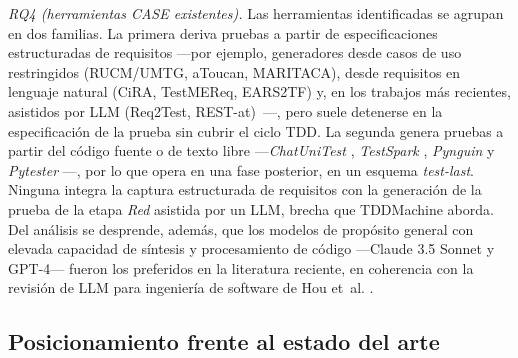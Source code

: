 \documentclass[10pt,journal,twoside,letterpaper]{IEEEtran}
\begin{document}
	\textit{RQ4 (herramientas CASE existentes).} Las herramientas identificadas se agrupan en dos familias. La primera deriva pruebas a partir de especificaciones estructuradas de requisitos ---por ejemplo, generadores desde casos de uso restringidos (RUCM/UMTG, aToucan, MARITACA), desde requisitos en lenguaje natural (CiRA, TestMEReq, EARS2TF) y, en los trabajos más recientes, asistidos por LLM (Req2Test, REST-at)~\cite{Morales2024Dsl,Khaldi2026Agentic,Orekhov2026Example,Fathima2026Automated,Bhatia2025Automated,Jang2025Automatic,Shimizu2025Automatic,Ishinari2026Data,Arruda2026Deriving,Trinh2026Fstg,Ishinari2025Improving,Louzaoui2016Invalid,Borg2022Quality,LeonQuinstedt2026Rest,Franca2026Req2test,Sinha2015Requirements,Wei2024Requirements,Wen2026Research,Salari2026Test,Varpe2025User,Li2026Test,Trinh2026Tcg,Wu2022Node,Herwanto2025Enhancing,Baker2026Industrial,Dilorenzo2026Recommending}---, pero suele detenerse en la especificación de la prueba sin cubrir el ciclo TDD. La segunda genera pruebas a partir del código fuente o de texto libre ---\emph{ChatUniTest} \cite{chen2024chatunitest}, \emph{TestSpark} \cite{sapozhnikov2024testspark}, \emph{Pynguin} \cite{lukasczyk2022pynguin} y \emph{Pytester} \cite{takerngsaksiri2025pytester}---, por lo que opera en una fase posterior, en un esquema \emph{test-last}. Ninguna integra la captura estructurada de requisitos con la generación de la prueba de la etapa \emph{Red} asistida por un LLM, brecha que TDDMachine aborda. Del análisis se desprende, además, que los modelos de propósito general con elevada capacidad de síntesis y procesamiento de código ---Claude 3.5 Sonnet y GPT-4--- fueron los preferidos en la literatura reciente, en coherencia con la revisión de LLM para ingeniería de software de Hou et~al. \cite{hou2024llm4se}.

	\subsection{Posicionamiento frente al estado del arte}
	\label{subsec:posicionamiento}
\end{document}
